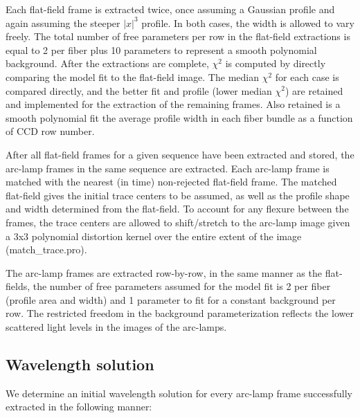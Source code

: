 \documentclass[12pt,preprint]{aastex}
\begin{document}
Each flat-field frame is extracted twice, once assuming a Gaussian
profile and again assuming the steeper $|x|^3$ profile.  In both cases,
the width is allowed to vary freely.  The total number of free parameters
per row in the flat-field extractions is equal to 2 per fiber plus 10
parameters to represent a smooth polynomial background.  After the extractions
are complete, $\chi^2$ is computed by directly comparing the model fit
to the flat-field image.  The median $\chi^2$ for each case is compared
directly, and the better fit and profile (lower median $\chi^2$) are retained
and implemented for the extraction of the remaining frames.  Also retained
is a smooth polynomial fit the average profile width in each fiber bundle
as a function of CCD row number.

After all flat-field frames for a given sequence have been extracted
and stored, the arc-lamp frames in the same sequence are extracted.  
Each arc-lamp frame is matched with the nearest (in time) 
non-rejected flat-field frame.  The matched flat-field gives the 
initial trace centers to
be assumed, as well as the profile shape and width determined from the
flat-field.  To account for any flexure between the frames, the trace
centers are allowed to shift/stretch to the arc-lamp image given a 
3x3 polynomial distortion kernel over the entire extent of the image
(match\_trace.pro).

The arc-lamp frames are extracted row-by-row, in the same
manner as the flat-fields, the number of free parameters assumed
for the model fit is 2 per fiber (profile area and width) and 1 parameter
to fit for a constant background per row.  The restricted freedom in the
background parameterization reflects the lower scattered light levels in
the images of the arc-lamps.

\subsection{Wavelength solution}

We determine an initial wavelength solution for every arc-lamp frame
successfully extracted in the following manner:
\end{document}
